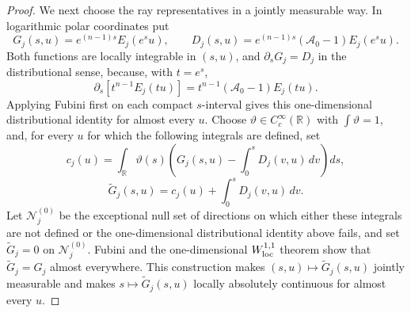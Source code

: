 \documentclass[11pt]{article}
\numberwithin{equation}{section}
\theoremstyle{remark}
\theoremstyle{definition}
\newcommand{\R}{\mathbb R}
\begin{document}
\begin{proof}
We next choose the ray representatives in a jointly measurable way.  In
logarithmic polar coordinates put
\[
 G_j(s,u)=e^{(n-1)s}E_j(e^su),\qquad
 D_j(s,u)=e^{(n-1)s}(\mathcal A_0-1)E_j(e^su).
\]
Both functions are locally integrable in $(s,u)$, and
$\partial_sG_j=D_j$ in the distributional sense, because, with $t=e^s$,
\[
 \partial_s[t^{n-1}E_j(tu)]
 =t^{n-1}(\mathcal A_0-1)E_j(tu).
\]
Applying Fubini first on each compact $s$-interval gives this
one-dimensional distributional identity for almost every $u$.  Choose
$\vartheta\in C_c^\infty(\R)$ with $\int\vartheta=1$, and, for every
$u$ for which the following integrals are defined, set
\[
 c_j(u)=\int_\R\vartheta(s)
 \left(G_j(s,u)-\int_0^sD_j(v,u)\,dv\right)ds,
\]
\[
 \widetilde G_j(s,u)=c_j(u)+\int_0^sD_j(v,u)\,dv.
\]
Let $\mathcal N_j^{(0)}$ be the exceptional null set of directions on
which either these integrals are not defined or the one-dimensional
distributional identity above fails, and set $\widetilde G_j=0$ on
$\mathcal N_j^{(0)}$.
Fubini and the one-dimensional $W^{1,1}_{\rm loc}$ theorem show that
$\widetilde G_j=G_j$ almost everywhere.  This construction makes
$(s,u)\mapsto\widetilde G_j(s,u)$ jointly measurable and makes
$s\mapsto\widetilde G_j(s,u)$ locally absolutely continuous for almost
every $u$.


\end{proof}
\end{document}
